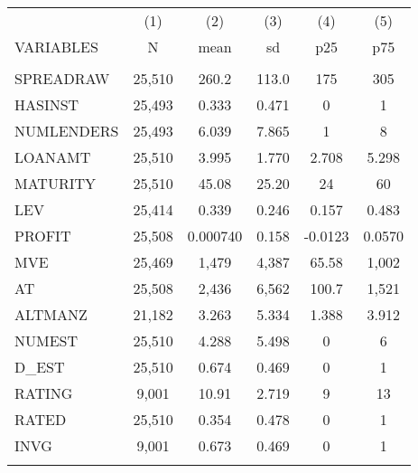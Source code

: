 \begin{tabular}{lccccc} \hline
 & (1) & (2) & (3) & (4) & (5) \\
VARIABLES & N & mean & sd & p25 & p75 \\ \hline
 &  &  &  &  &  \\
SPREADRAW & 25,510 & 260.2 & 113.0 & 175 & 305 \\
HASINST & 25,493 & 0.333 & 0.471 & 0 & 1 \\
NUMLENDERS & 25,493 & 6.039 & 7.865 & 1 & 8 \\
LOANAMT & 25,510 & 3.995 & 1.770 & 2.708 & 5.298 \\
MATURITY & 25,510 & 45.08 & 25.20 & 24 & 60 \\
LEV & 25,414 & 0.339 & 0.246 & 0.157 & 0.483 \\
PROFIT & 25,508 & 0.000740 & 0.158 & -0.0123 & 0.0570 \\
MVE & 25,469 & 1,479 & 4,387 & 65.58 & 1,002 \\
AT & 25,508 & 2,436 & 6,562 & 100.7 & 1,521 \\
ALTMANZ & 21,182 & 3.263 & 5.334 & 1.388 & 3.912 \\
NUMEST & 25,510 & 4.288 & 5.498 & 0 & 6 \\
D\_EST & 25,510 & 0.674 & 0.469 & 0 & 1 \\
RATING & 9,001 & 10.91 & 2.719 & 9 & 13 \\
RATED & 25,510 & 0.354 & 0.478 & 0 & 1 \\
INVG & 9,001 & 0.673 & 0.469 & 0 & 1 \\
 &  &  &  &  &  \\ \hline
\end{tabular}
